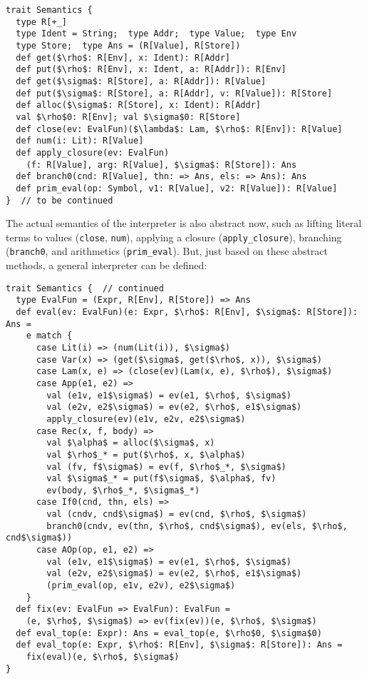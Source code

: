 \begin{lstlisting}
trait Semantics {
  type R[+_]
  type Ident = String;  type Addr;  type Value;  type Env
  type Store;  type Ans = (R[Value], R[Store])
  def get($\rho$: R[Env], x: Ident): R[Addr]
  def put($\rho$: R[Env], x: Ident, a: R[Addr]): R[Env]
  def get($\sigma$: R[Store], a: R[Addr]): R[Value]
  def put($\sigma$: R[Store], a: R[Addr], v: R[Value]): R[Store]
  def alloc($\sigma$: R[Store], x: Ident): R[Addr]
  val $\rho$0: R[Env]; val $\sigma$0: R[Store]
  def close(ev: EvalFun)($\lambda$: Lam, $\rho$: R[Env]): R[Value]
  def num(i: Lit): R[Value]
  def apply_closure(ev: EvalFun)
    (f: R[Value], arg: R[Value], $\sigma$: R[Store]): Ans
  def branch0(cnd: R[Value], thn: => Ans, els: => Ans): Ans
  def prim_eval(op: Symbol, v1: R[Value], v2: R[Value]): R[Value]
}  // to be continued
\end{lstlisting}

The actual semantics of the interpreter is also abstract now, such as lifting literal terms to values 
(\texttt{close}, \texttt{num}), applying a closure (\texttt{apply\_closure}), branching (\texttt{branch0},
and arithmetics (\texttt{prim\_eval}). But, just based on these abstract methods, a general interpreter 
can be defined:

\begin{lstlisting}
trait Semantics {  // continued
  type EvalFun = (Expr, R[Env], R[Store]) => Ans
  def eval(ev: EvalFun)(e: Expr, $\rho$: R[Env], $\sigma$: R[Store]): Ans = 
    e match {
      case Lit(i) => (num(Lit(i)), $\sigma$)
      case Var(x) => (get($\sigma$, get($\rho$, x)), $\sigma$)
      case Lam(x, e) => (close(ev)(Lam(x, e), $\rho$), $\sigma$)
      case App(e1, e2) =>
        val (e1v, e1$\sigma$) = ev(e1, $\rho$, $\sigma$)
        val (e2v, e2$\sigma$) = ev(e2, $\rho$, e1$\sigma$)
        apply_closure(ev)(e1v, e2v, e2$\sigma$)
      case Rec(x, f, body) =>
        val $\alpha$ = alloc($\sigma$, x)
        val $\rho$_* = put($\rho$, x, $\alpha$)
        val (fv, f$\sigma$) = ev(f, $\rho$_*, $\sigma$)
        val $\sigma$_* = put(f$\sigma$, $\alpha$, fv)
        ev(body, $\rho$_*, $\sigma$_*)
      case If0(cnd, thn, els) =>
        val (cndv, cnd$\sigma$) = ev(cnd, $\rho$, $\sigma$)
        branch0(cndv, ev(thn, $\rho$, cnd$\sigma$), ev(els, $\rho$, cnd$\sigma$))
      case AOp(op, e1, e2) =>
        val (e1v, e1$\sigma$) = ev(e1, $\rho$, $\sigma$)
        val (e2v, e2$\sigma$) = ev(e2, $\rho$, e1$\sigma$)
        (prim_eval(op, e1v, e2v), e2$\sigma$)
    }
  def fix(ev: EvalFun => EvalFun): EvalFun = 
    (e, $\rho$, $\sigma$) => ev(fix(ev))(e, $\rho$, $\sigma$)
  def eval_top(e: Expr): Ans = eval_top(e, $\rho$0, $\sigma$0)
  def eval_top(e: Expr, $\rho$: R[Env], $\sigma$: R[Store]): Ans = 
    fix(eval)(e, $\rho$, $\sigma$)
}
\end{lstlisting}

